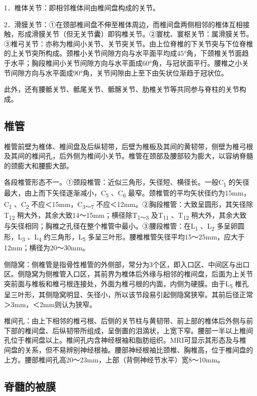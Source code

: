 1．椎体关节：即相邻椎体间由椎间盘构成的关节。

2．滑膜关节：①在颈部椎间盘不伸至椎体周边，而椎间盘两侧相邻的椎体互相接触，形成滑膜关节（但无关节囊）即钩椎关节。②寰枕、寰枢关节：属滑膜关节。③椎弓关节：亦称为椎间小关节、关节突关节。由上位脊椎的下关节突与下位脊椎的上关节突所构成。颈椎小关节间隙方向与水平面平均成45°角，下颈椎关节面趋于水平；胸段椎间小关节间隙方向与水平面成60°角，与冠状面平行。腰椎之小关节间隙方向与水平面成90°角，关节间隙由上至下由矢状位渐趋于冠状位。

此外，还有腰骶关节、骶尾关节、骶髂关节、肋椎关节等共同参与脊柱的关节构成。

\subsection{椎管}

椎管前壁为椎体、椎间盘及后纵韧带，后壁为椎板及其间的黄韧带，侧壁为椎弓根及其间的椎间孔，后外侧为椎间小关节。椎管在颈部及腰部较为膨大，以容纳脊髓的颈膨大和腰膨大部。

各段椎管形态不一。①颈段椎管：近似三角形，矢径短、横径长。一般C\textsubscript{1}
的矢径最大，由上而下矢径逐渐减小，C\textsubscript{5}
、C\textsubscript{6}
最窄。颈椎管的平均矢状径约为15mm，C\textsubscript{1}
、C\textsubscript{2} 不应＜15mm，C\textsubscript{3～7}
不应＜12mm。②胸段椎管：大致呈圆形，其矢径除T\textsubscript{12}
稍大外，其余大致14～15mm；横径除T\textsubscript{1～3}
及T\textsubscript{11} 、T\textsubscript{12}
稍大外，其余大致与矢径相同；胸椎之孔径在整个椎管中最小。③腰段椎管：在L\textsubscript{1}
、L\textsubscript{2} 多呈卵圆形，L\textsubscript{3} 、L\textsubscript{4}
约三角形，L\textsubscript{5}
多呈三叶形。腰椎椎管矢径平均15～25mm，应大于12mm；横径为20～30mm。

侧隐窝：侧椎管是指骨性椎管的外侧部，常分为3个区，即入口区、中间区与出口区。侧隐窝为侧椎管入口区，其前界为椎体后外缘与相邻的椎间盘，后面为上关节突前面与椎板和椎弓根连接处，外面为椎弓根的内面，内侧为硬膜。由于L\textsubscript{5}
椎孔呈三叶形，其侧隐窝明显、矢径小，所以该节段易引起侧隐窝狭窄。其前后径正常＞3mm，＜2mm则认为狭窄。

椎间孔：由上下相邻的椎弓根、后侧的关节柱与黄韧带、前上部的椎体后外侧与前下部的椎间盘、后纵韧带所组成，呈倒置的泪滴状，上宽下窄。腰部一半以上椎间孔位于椎间盘以上。椎间孔内含神经根袖和脂肪组织。MRI可显示其形态及与椎间盘的关系，但不易辨别神经根袖。腰部神经根袖比颈椎、胸椎高，位于椎间盘的上方。腰部椎间孔高20～23mm，上部（背侧神经节水平）宽8～10mm。

\subsection{脊髓的被膜}

